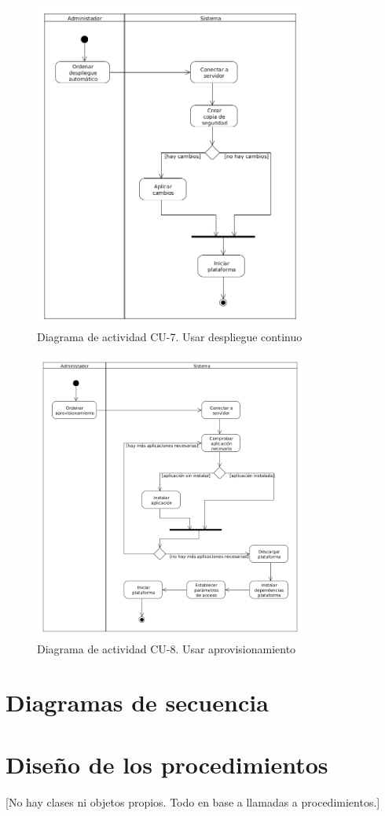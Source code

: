 \begin{figure}[!h]
  \begin{center}
  \includegraphics[width=0.8\textwidth]{imagenes/diagrama_actividad_cu_7.png}
  \caption[diag_act_cu_7]{Diagrama de actividad CU-7. Usar despliegue continuo}
  \label{fig:diag_act_cu_7}
  \end{center}
\end{figure}

\begin{figure}[!h]
  \begin{center}
  \includegraphics[width=0.8\textwidth]{imagenes/diagrama_actividad_cu_8.png}
  \caption[diag_act_cu_8]{Diagrama de actividad CU-8. Usar aprovisionamiento}
  \label{fig:diag_act_cu_8}
  \end{center}
\end{figure}

\section{Diagramas de secuencia}

\section{Diseño de los procedimientos}

[No hay clases ni objetos propios. Todo en base a llamadas a procedimientos.]